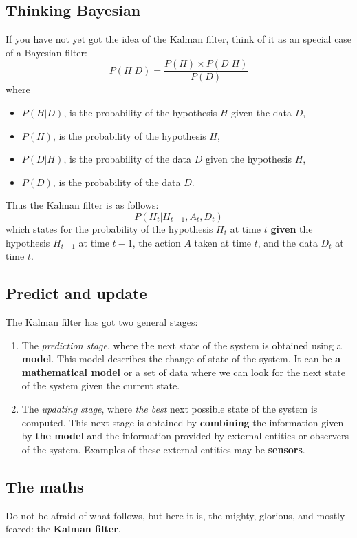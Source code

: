\documentclass[12pt,a4paper,final]{article} %
\begin{document}
\subsection{Thinking Bayesian}
If you have not yet got the idea of the Kalman filter, think of it as
an special case of a Bayesian filter:
\begin{equation}
  \label{eq:bayesian}
  P(H|D) = \frac{P(H) \times P(D|H)}{P(D)}
\end{equation}
where
\begin{itemize}
\item $P(H|D)$, is the probability of the hypothesis $H$ given the
  data $D$,
\item $P(H)$, is the probability of the hypothesis $H$,
\item $P(D|H)$, is the probability of the data $D$ given the
  hypothesis $H$,
\item $P(D)$, is the probability of the data $D$.
\end{itemize}
Thus the Kalman filter is as follows:
\begin{equation}
  \label{eq:kalman_as_bayesian}
  P(H_t|H_{t-1},A_t,D_t)
\end{equation}
which states for the probability of the hypothesis $H_t$ at time $t$
\textbf{given} the hypothesis $H_{t-1}$ at time $t-1$, the action $A$
taken at time $t$, and the data $D_t$ at time $t$.

\subsection{Predict and update}
The Kalman filter has got two general stages:
\begin{enumerate}
\item The \textit{prediction stage}, where the next state of the
  system is obtained using a \textbf{model}. This model describes the
  change of state of the system. It can be \textbf{a mathematical
    model} or a set of data where we can look for the next state of
  the system given the current state.
\item The \textit{updating stage}, where \textit{the best} next
  possible state of the system is computed. This next stage is
  obtained by \textbf{combining} the information given by \textbf{the
    model} and the information provided by external entities or
  observers of the system. Examples of these external entities may be
  \textbf{sensors}.
\end{enumerate}

\subsection{The maths}
\label{sec:the_maths}
Do not be afraid of what follows, but here it is, the mighty,
glorious, and mostly feared: the \textbf{Kalman filter}.
\end{document}
